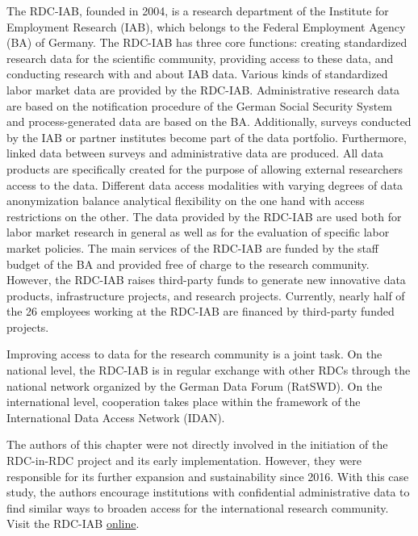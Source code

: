 The RDC-IAB, founded in 2004, is a research department of the Institute for Employment Research (IAB), which belongs to the Federal Employment Agency (BA) of Germany. The RDC-IAB has three core functions: creating standardized research data for the scientific community, providing access to these data, and conducting research with and about IAB data. Various kinds of standardized labor market data are provided by the RDC-IAB. Administrative research data are based on the notification procedure of the German Social Security System and process-generated data are based on the BA. Additionally, surveys conducted by the IAB or partner institutes become part of the data portfolio. Furthermore, linked data between surveys and administrative data are produced. All data products are specifically created for the purpose of allowing external researchers access to the data. Different data access modalities with varying degrees of data anonymization balance analytical flexibility on the one hand with access restrictions on the other. The data provided by the RDC-IAB are used both for labor market research in general as well as for the evaluation of specific labor market policies. The main services of the RDC-IAB are funded by the staff budget of the BA and provided free of charge to the research community. However, the RDC-IAB raises third-party funds to generate new innovative data products, infrastructure projects, and research projects. Currently, nearly half of the 26 employees working at the RDC-IAB are financed by third-party funded projects.

Improving access to data for the research community is a joint task. On the national level, the RDC-IAB is in regular exchange with other RDCs through the national network organized by the German Data Forum (RatSWD). On the international level, cooperation takes place within the framework of the International Data Access Network (IDAN).

The authors of this chapter were not directly involved in the initiation of the RDC-in-RDC project and its early implementation. However, they were responsible for its further expansion and sustainability since 2016. With this case study, the authors encourage institutions with confidential administrative data to find similar ways to broaden access for the international research community. Visit the RDC-IAB \href{https://fdz.iab.de/en.aspx}{online}.

